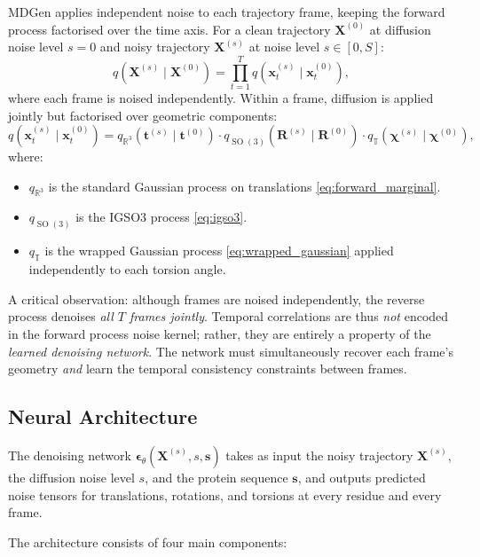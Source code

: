 \documentclass[11pt,a4paper]{article}
\DeclareMathOperator{\SO}{SO}
\newcommand{\bx}{\mathbf{x}}
\newcommand{\bX}{\mathbf{X}}
\newcommand{\bs}{\mathbf{s}}
\newcommand{\bR}{\mathbf{R}}
\newcommand{\bt}{\mathbf{t}}
\newcommand{\beps}{\boldsymbol{\epsilon}}
\newcommand{\RR}{\mathbb{R}}
\newcommand{\TT}{\mathbb{T}}
\begin{document}
MDGen applies independent noise to each trajectory frame, keeping the forward process
factorised over the time axis.  For a clean trajectory $\bX^{(0)}$ at diffusion noise level
$s = 0$ and noisy trajectory $\bX^{(s)}$ at noise level $s \in [0, S]$:
\begin{equation}
  q(\bX^{(s)} \mid \bX^{(0)}) = \prod_{t=1}^{T} q(\bx_t^{(s)} \mid \bx_t^{(0)}),
  \label{eq:forward_trajectory}
\end{equation}
where each frame is noised independently.  Within a frame, diffusion is applied jointly but
factorised over geometric components:
\begin{equation}
  q(\bx_t^{(s)} \mid \bx_t^{(0)}) =
  q_{\RR^3}(\bt^{(s)} \mid \bt^{(0)}) \cdot
  q_{\SO(3)}(\bR^{(s)} \mid \bR^{(0)}) \cdot
  q_{\TT}(\bm\chi^{(s)} \mid \bm\chi^{(0)}),
  \label{eq:frame_forward}
\end{equation}
where:
\begin{itemize}[leftmargin=2em]
  \item $q_{\RR^3}$ is the standard Gaussian process on translations \eqref{eq:forward_marginal}.
  \item $q_{\SO(3)}$ is the IGSO3 process \eqref{eq:igso3}.
  \item $q_{\TT}$ is the wrapped Gaussian process \eqref{eq:wrapped_gaussian} applied independently
    to each torsion angle.
\end{itemize}

A critical observation: although frames are noised independently, the reverse process denoises
\emph{all $T$ frames jointly}.  Temporal correlations are thus \emph{not} encoded in the forward
process noise kernel; rather, they are entirely a property of the \emph{learned denoising
network}.  The network must simultaneously recover each frame's geometry \emph{and} learn the
temporal consistency constraints between frames.

\subsection{Neural Architecture}
\label{sec:architecture}

The denoising network $\beps_\theta(\bX^{(s)}, s, \bs)$ takes as input the noisy trajectory
$\bX^{(s)}$, the diffusion noise level $s$, and the protein sequence $\bs$, and outputs predicted
noise tensors for translations, rotations, and torsions at every residue and every frame.

The architecture consists of four main components:
\end{document}
